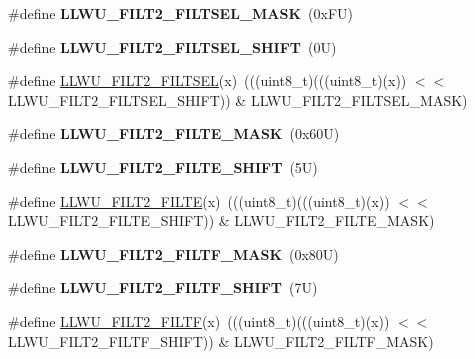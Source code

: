 \begin{DoxyCompactItemize}
\item 
\mbox{\label{group___l_l_w_u___register___masks_gae610069172bf4a4b8f783d54faf97496}} 
\#define {\bfseries L\+L\+W\+U\+\_\+\+F\+I\+L\+T2\+\_\+\+F\+I\+L\+T\+S\+E\+L\+\_\+\+M\+A\+SK}~(0x\+F\+U)
\item 
\mbox{\label{group___l_l_w_u___register___masks_ga4589e4982f58847b133e9792fac931ac}} 
\#define {\bfseries L\+L\+W\+U\+\_\+\+F\+I\+L\+T2\+\_\+\+F\+I\+L\+T\+S\+E\+L\+\_\+\+S\+H\+I\+FT}~(0\+U)
\item 
\#define \mbox{\hyperlink{group___l_l_w_u___register___masks_ga158cb43770e2439838189522bb7696a3}{L\+L\+W\+U\+\_\+\+F\+I\+L\+T2\+\_\+\+F\+I\+L\+T\+S\+EL}}(x)~(((uint8\+\_\+t)(((uint8\+\_\+t)(x)) $<$$<$ L\+L\+W\+U\+\_\+\+F\+I\+L\+T2\+\_\+\+F\+I\+L\+T\+S\+E\+L\+\_\+\+S\+H\+I\+FT)) \& L\+L\+W\+U\+\_\+\+F\+I\+L\+T2\+\_\+\+F\+I\+L\+T\+S\+E\+L\+\_\+\+M\+A\+SK)
\item 
\mbox{\label{group___l_l_w_u___register___masks_ga6c6d4145e30bdb324bc6b137b2f7aada}} 
\#define {\bfseries L\+L\+W\+U\+\_\+\+F\+I\+L\+T2\+\_\+\+F\+I\+L\+T\+E\+\_\+\+M\+A\+SK}~(0x60\+U)
\item 
\mbox{\label{group___l_l_w_u___register___masks_gac309ec1ef795572d048b09ac35847bf1}} 
\#define {\bfseries L\+L\+W\+U\+\_\+\+F\+I\+L\+T2\+\_\+\+F\+I\+L\+T\+E\+\_\+\+S\+H\+I\+FT}~(5\+U)
\item 
\#define \mbox{\hyperlink{group___l_l_w_u___register___masks_ga3c7ed2286e6f1a0041610a9b7de636ef}{L\+L\+W\+U\+\_\+\+F\+I\+L\+T2\+\_\+\+F\+I\+L\+TE}}(x)~(((uint8\+\_\+t)(((uint8\+\_\+t)(x)) $<$$<$ L\+L\+W\+U\+\_\+\+F\+I\+L\+T2\+\_\+\+F\+I\+L\+T\+E\+\_\+\+S\+H\+I\+FT)) \& L\+L\+W\+U\+\_\+\+F\+I\+L\+T2\+\_\+\+F\+I\+L\+T\+E\+\_\+\+M\+A\+SK)
\item 
\mbox{\label{group___l_l_w_u___register___masks_gab60be1393d84433fe44d4b332a77537c}} 
\#define {\bfseries L\+L\+W\+U\+\_\+\+F\+I\+L\+T2\+\_\+\+F\+I\+L\+T\+F\+\_\+\+M\+A\+SK}~(0x80\+U)
\item 
\mbox{\label{group___l_l_w_u___register___masks_ga20b3ccaef11cade3a0dc88b3a378b790}} 
\#define {\bfseries L\+L\+W\+U\+\_\+\+F\+I\+L\+T2\+\_\+\+F\+I\+L\+T\+F\+\_\+\+S\+H\+I\+FT}~(7\+U)
\item 
\#define \mbox{\hyperlink{group___l_l_w_u___register___masks_gaa36637f2a12654139ec6c8b76f313c8d}{L\+L\+W\+U\+\_\+\+F\+I\+L\+T2\+\_\+\+F\+I\+L\+TF}}(x)~(((uint8\+\_\+t)(((uint8\+\_\+t)(x)) $<$$<$ L\+L\+W\+U\+\_\+\+F\+I\+L\+T2\+\_\+\+F\+I\+L\+T\+F\+\_\+\+S\+H\+I\+FT)) \& L\+L\+W\+U\+\_\+\+F\+I\+L\+T2\+\_\+\+F\+I\+L\+T\+F\+\_\+\+M\+A\+SK)
\end{DoxyCompactItemize}



